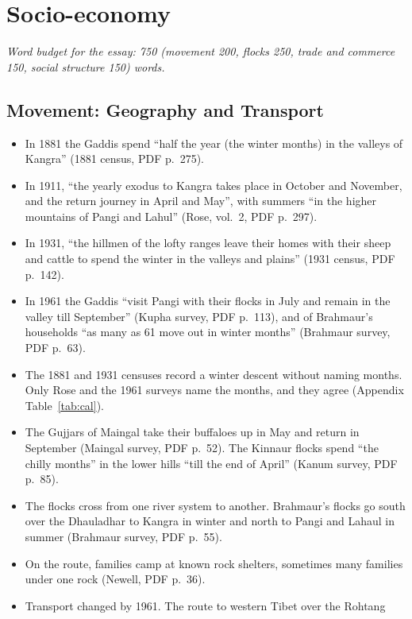 \documentclass[11pt,a4paper]{article}
\newcommand{\cit}[1]{{\small(#1)}}
\newcommand{\budget}[1]{\par\noindent\textit{Word budget for the essay: #1 words.}\par\smallskip}
\begin{document}
\section{Socio-economy}
\budget{750 (movement 200, flocks 250, trade and commerce 150, social structure 150)}

\subsection{Movement: Geography and Transport}\label{sec:movement}
\begin{itemize}
\item In 1881 the Gaddis spend \enquote{half the year (the winter months) in the
  valleys of Kangra} \cit{1881 census, PDF p.~275}.
\item In 1911, \enquote{the yearly exodus to Kangra takes place in October and
  November, and the return journey in April and May}, with summers \enquote{in
  the higher mountains of Pangi and Lahul} \cit{Rose, vol.~2, PDF p.~297}.
\item In 1931, \enquote{the hillmen of the lofty ranges leave their homes with
  their sheep and cattle to spend the winter in the valleys and plains}
  \cit{1931 census, PDF p.~142}.
\item In 1961 the Gaddis \enquote{visit Pangi with their flocks in July and
  remain in the valley till September} \cit{Kupha survey, PDF p.~113}, and of
  Brahmaur's households \enquote{as many as 61 move out in winter months}
  \cit{Brahmaur survey, PDF p.~63}.
\item The 1881 and 1931 censuses record a winter descent without naming months.
  Only Rose and the 1961 surveys name the months, and they agree
  \cit{Appendix Table~\ref{tab:cal}}.
\item The Gujjars of Maingal take their buffaloes up in May and return in
  September \cit{Maingal survey, PDF p.~52}. The Kinnaur flocks spend
  \enquote{the chilly months} in the lower hills \enquote{till the end of April}
  \cit{Kanum survey, PDF p.~85}.
\item The flocks cross from one river system to another. Brahmaur's flocks go
  south over the Dhauladhar to Kangra in winter and north to Pangi and Lahaul
  in summer \cit{Brahmaur survey, PDF p.~55}.
\item On the route, families camp at known rock shelters, sometimes many
  families under one rock \cit{Newell, PDF p.~36}.
\item Transport changed by 1961. The route to western Tibet over the Rohtang

\end{itemize}
\end{document}
